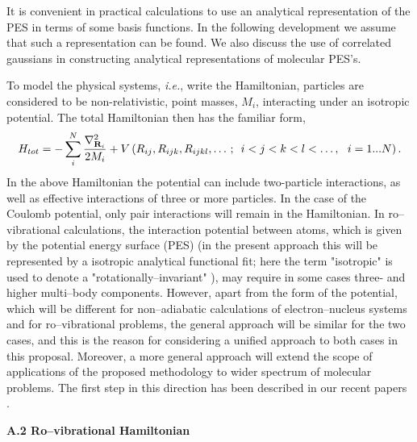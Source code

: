 It is convenient in practical calculations to use an
analytical representation of the PES in terms of some
basis functions. In the following development we
assume that such a representation can be found.
We also discuss the use of correlated gaussians 
in constructing analytical representations of molecular PES's.

To model the physical systems, {\it i.e.}, 
write the Hamiltonian, particles are
considered to be non-relativistic, point masses,
$M_i$, interacting under
an isotropic potential. The total Hamiltonian then has the familiar form, 
\begin{equation}
H_{tot}=-\sum_i^N\frac{\nabla _{{\bf R}_i}^2}{2M_i}
+ V\left(R_{ij}, R_{ijk}, R_{ijkl}, \ldots%
\,;\,\,\,i<j<k<l<\ldots ,\,\,\,\,i=1...N\right).
\label{ham1}
\end{equation}
In the above Hamiltonian the potential can include two-particle
interactions, as well as effective interactions 
of three or more particles. 
In the case of the Coulomb potential, only pair interactions
will remain in the Hamiltonian. In ro--vibrational calculations,
the interaction potential between atoms, which is given by the
potential energy surface (PES) (in the present approach this will be 
represented by a isotropic analytical 
functional fit; here the term "isotropic"
is used to denote a "rotationally--invariant" ),
may require in some cases three- and higher multi--body
components. However, apart from the form of the potential, which
will be different for non--adiabatic calculations of electron--nucleus
systems and for ro--vibrational problems, the general approach
will be similar for the two cases, and this is the reason
for considering 
a unified approach to
both cases in this proposal. 
Moreover, a more general approach will extend the scope of applications
of the proposed methodology to wider spectrum of molecular problems.
The first step in this direction has been described in our recent papers
\cite{A382,A383}.


\vspace{2mm}
\noindent
{\bf A.2 Ro--vibrational Hamiltonian}


